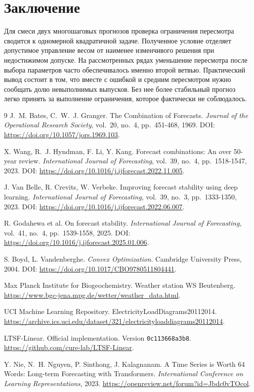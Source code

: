 \documentclass{misisarticle}
\begin{document}
\balance
\section{Заключение}

Для смеси двух многошаговых прогнозов проверка ограничения пересмотра сводится к одномерной квадратичной задаче. Полученное условие отделяет допустимое управление весом от наименее изменчивого решения при недостижимом допуске. На рассмотренных рядах уменьшение пересмотра после выбора параметров часто обеспечивалось именно второй ветвью. Практический вывод состоит в том, что вместе с ошибкой и средним пересмотром нужно сообщать долю невыполнимых выпусков. Без нее более стабильный прогноз легко принять за выполнение ограничения, которое фактически не соблюдалось.

\begin{thebibliography}{9}
J.~M. Bates, C.~W.~J. Granger.
The Combination of Forecasts.
\textit{Journal of the Operational Research Society},
vol.~20, no.~4, pp.~451-468, 1969.
DOI: \url{https://doi.org/10.1057/jors.1969.103}.

X. Wang, R.~J. Hyndman, F. Li, Y. Kang.
Forecast combinations: An over 50-year review.
\textit{International Journal of Forecasting},
vol.~39, no.~4, pp.~1518-1547, 2023.
DOI: \url{https://doi.org/10.1016/j.ijforecast.2022.11.005}.

J. Van Belle, R. Crevits, W. Verbeke.
Improving forecast stability using deep learning.
\textit{International Journal of Forecasting},
vol.~39, no.~3, pp.~1333-1350, 2023.
DOI: \url{https://doi.org/10.1016/j.ijforecast.2022.06.007}.

R. Godahewa et al.
On forecast stability.
\textit{International Journal of Forecasting},
vol.~41, no.~4, pp.~1539-1558, 2025.
DOI: \url{https://doi.org/10.1016/j.ijforecast.2025.01.006}.

S. Boyd, L. Vandenberghe.
\textit{Convex Optimization}.
Cambridge University Press, 2004.
DOI: \url{https://doi.org/10.1017/CBO9780511804441}.

Max Planck Institute for Biogeochemistry.
Weather station WS Beutenberg.
\url{https://www.bgc-jena.mpg.de/wetter/weather_data.html}.

UCI Machine Learning Repository.
ElectricityLoadDiagrams20112014.
\url{https://archive.ics.uci.edu/dataset/321/electricityloaddiagrams20112014}.

LTSF-Linear. Official implementation.
Version \texttt{0c113668a3b8}.
\url{https://github.com/cure-lab/LTSF-Linear}.

Y. Nie, N.~H. Nguyen, P. Sinthong, J. Kalagnanam.
A Time Series is Worth 64 Words:
Long-term Forecasting with Transformers.
\textit{International Conference on Learning Representations}, 2023.
\url{https://openreview.net/forum?id=Jbdc0vTOcol}.
\end{thebibliography}
\end{document}
